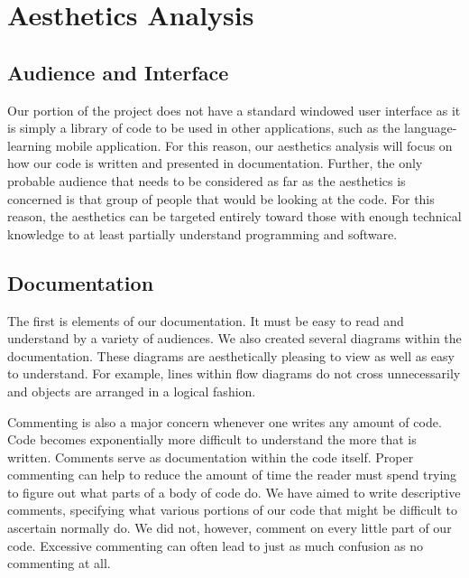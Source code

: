 \chapter{Aesthetics Analysis}

\section{Audience and Interface}
Our portion of the project does not have a standard windowed user interface as it is simply a library of code to be used in other applications, such as the language-learning mobile application. For this reason, our aesthetics analysis will focus on how our code is written and presented in documentation. Further, the only probable audience that needs to be considered as far as the aesthetics is concerned is that group of people that would be looking at the code. For this reason, the aesthetics can be targeted entirely toward those with enough technical knowledge to at least partially understand programming and software.


\section{Documentation}
The first is elements of our documentation. It must be easy to read and understand by a variety of audiences. We also created several diagrams within the documentation. These diagrams are aesthetically pleasing to view as well as easy to understand. For example, lines within flow diagrams do not cross unnecessarily and objects are arranged in a logical fashion.

Commenting is also a major concern whenever one writes any amount of code. Code becomes exponentially more difficult to understand the more that is written. Comments serve as documentation within the code itself. Proper commenting can help to reduce the amount of time the reader must spend trying to figure out what parts of a body of code do. We have aimed to write descriptive comments, specifying what various portions of our code that might be difficult to ascertain normally do. We did not, however, comment on every little part of our code. Excessive commenting can often lead to just as much confusion as no commenting at all.


